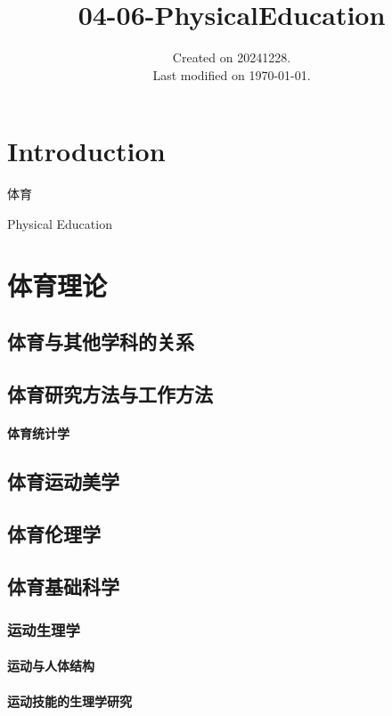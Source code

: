 \documentclass[UTF8]{../../ApplicationUniverse}
\begin{document}
\title{04-06-PhysicalEducation}
\date{Created on 20241228.\\   Last modified on \today.}
\maketitle
\tableofcontents


\chapter{Introduction}


体育

Physical Education





\chapter{体育理论}
\section{体育与其他学科的关系}
\section{体育研究方法与工作方法}
    \subsubsection{体育统计学}
\section{体育运动美学}
\section{体育伦理学}

\section{体育基础科学}
    \subsection{运动生理学}
        \subsubsection{运动与人体结构}
        \subsubsection{运动技能的生理学研究}
\end{document}

